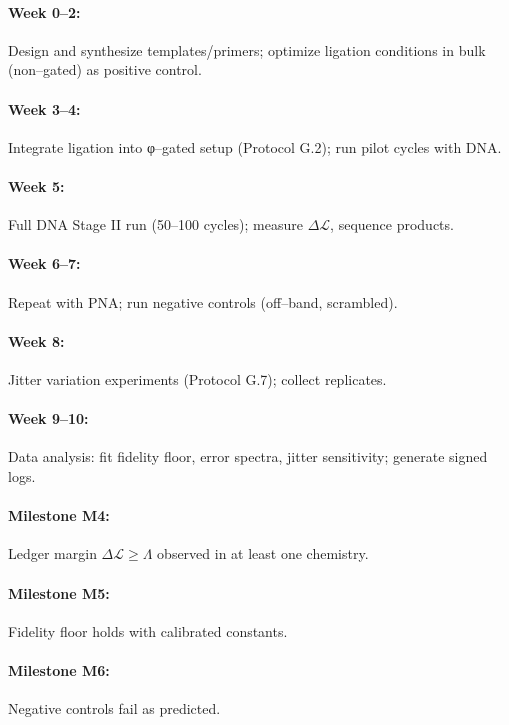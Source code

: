 \documentclass[11pt]{article}
\begin{document}
\paragraph{Week 0–2:} Design and synthesize templates/primers; optimize ligation conditions in bulk (non–gated) as positive control.

\paragraph{Week 3–4:} Integrate ligation into φ–gated setup (Protocol G.2); run pilot cycles with DNA.

\paragraph{Week 5:} Full DNA Stage II run (50–100 cycles); measure $\Delta\mathcal{L}$, sequence products.

\paragraph{Week 6–7:} Repeat with PNA; run negative controls (off–band, scrambled).

\paragraph{Week 8:} Jitter variation experiments (Protocol G.7); collect replicates.

\paragraph{Week 9–10:} Data analysis: fit fidelity floor, error spectra, jitter sensitivity; generate signed logs.

\paragraph{Milestone M4:} Ledger margin $\Delta\mathcal{L}\ge\Lambda$ observed in at least one chemistry.

\paragraph{Milestone M5:} Fidelity floor holds with calibrated constants.

\paragraph{Milestone M6:} Negative controls fail as predicted.
\end{document}
